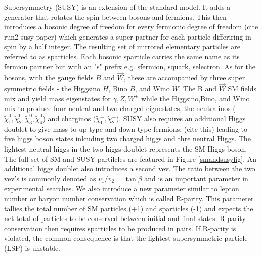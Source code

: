 Supersymmetry (SUSY) is an extension of the standard model. It adds a generator that rotates the spin between bosons and fermions. This then introduces a bosonic degree of freedom for every fermionic degree of freedom (cite run2 susy paper) which generates a super partner for each particle differiring in spin by a half integer.  The resulting set of mirrored elementary particles are referred to as sparticles. Each bosonic sparticle carries the same name as its fermion partner but with an "s" prefix e.g. sfermion, squark, selectron. As for the bosons, with the gauge fields $B$ and $\vec{W}$, these are accompanied by three super symmetric fields - the Higgsino $\tilde{H}$, Bino $\tilde{B}$, and Wino $\tilde{W}$. The B and $\vec{W}$ SM fields mix and yield mass eigenstates for $\gamma, Z, W^\pm$ while the Higgsino,Bino, and Wino mix to produce four neutral and two charged eignestates, the neutralinos ($\tilde{\chi}^0_1, \tilde{\chi}^0_2, \tilde{\chi}^0_3, \tilde{\chi}^0_4$)  and charginos ($\tilde{\chi}^\pm_1, \tilde{\chi}^\pm_2$). SUSY also requires an additional Higgs doublet to give mass to up-type and down-type fermions, (cite this) leading to five higgs boson states inlcuding two charged higgs and thre neutral Higgs. The lightest neutral higgs in the two higgs doublet represents the SM Higgs boson. The full set of SM and SUSY partilcles are featured in Figure \ref{smandsusyfig}. An additional higgs doublet also introduces a second vev. The ratio between the two vev's  is commonly denoted as $v_1/v_2 = \tan \beta$ and is an important parameter in experimental searches. We also introduce a new parameter similar to lepton number or baryon number conservation which is called R-parity. This parameter tallies the total number of SM particles (+1) and sparticles (-1) and expects the net total of particles to be conserved between initial and final states. R-parity conservation then requires sparticles to be produced in pairs. If R-parity is violated, the common consequence is that the lightest supersymmetric particle (LSP) is unstable. 




